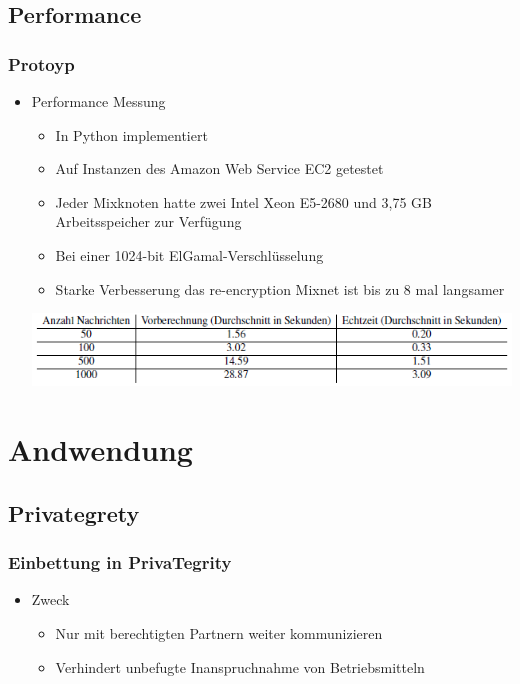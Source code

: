 \documentclass[t, xcolor=dvipsnames]{beamer}
\begin{document}
\subsection{Performance}
\begin{frame}
	\frametitle{Protoyp}
	\begin{itemize}
		\item Performance Messung
			\begin{itemize}
				\item In Python implementiert
				\item Auf Instanzen des Amazon Web Service EC2 getestet
				\item Jeder Mixknoten hatte zwei Intel Xeon E5-2680 und 3,75 GB Arbeitsspeicher zur Verfügung
				\item Bei einer 1024-bit ElGamal-Verschlüsselung
				\item Starke Verbesserung das re-encryption Mixnet ist bis zu 8 mal	langsamer
			\end{itemize}
			\begin{center}
				\includegraphics [scale=0.7]{pic/PrototypMessung.png}
			\end{center}
	\end{itemize}
	\vspace{\fill}
\end{frame}

\section{Andwendung}
\subsection{Privategrety}
\begin{frame}
	\frametitle{Einbettung in PrivaTegrity}
	\begin{itemize}
		\item Zweck
			\begin{itemize}
				\item Nur mit \alert{berechtigten Partnern} weiter kommunizieren
				\item Verhindert unbefugte Inanspruchnahme von Betriebsmitteln
			\end{itemize}
	\end{itemize}
	\vspace{\fill}
\end{frame}
\end{document}
